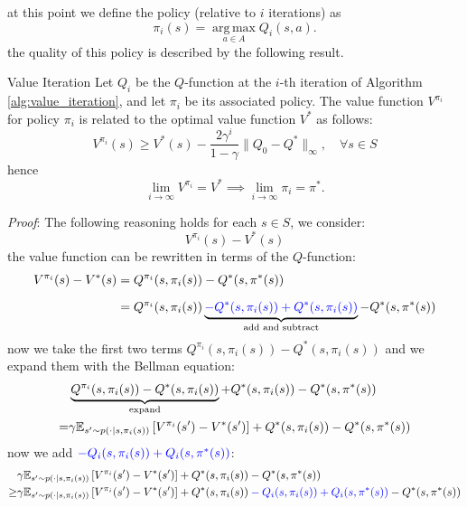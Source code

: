 \documentclass[10pt, a4paper]{report}
\begin{document}
at this point we define the policy (relative to $i$ iterations) as\begin{equation}
    \pi_i(s)=\operatorname*{arg\,max}_{a\in A}Q_i(s,a).
\end{equation}
the quality of this policy is described by the following result.
\begin{boxproposition}{Value Iteration}{}
Let $Q_i$ be the $Q$-function at the $i$-th iteration of Algorithm \ref{alg:value_iteration}, and let $\pi_i$ be its associated policy. The value function $V^{\pi_i}$ for policy $\pi_i$ is related to the optimal value function $V^*$ as follows:
\begin{equation}
    V^{\pi_i}(s)\ge V^*(s)-\frac{2\gamma^i}{1-\gamma}\|Q_0-Q^*\|_\infty,\quad \forall s\in S
\end{equation}
hence 
\begin{equation}
    \lim_{i\rightarrow\infty}V^{\pi_i}=V^*\implies  \lim_{i\rightarrow\infty}\pi_i=\pi^*.
\end{equation}
\end{boxproposition}
\noindent\textit{Proof}: The following reasoning holds for each $s\in S$, we consider:\begin{equation}
    V^{\pi_i}(s) - V^*(s)
\end{equation}
the value function can be rewritten in terms of the $Q$-function:
\begin{align}
    V^{\pi_i}(s) - V^*(s)&=Q^{\pi_i}(s,\pi_i(s))-Q^*(s,\pi^*(s))\\[1.5ex]
    &=Q^{\pi_i}(s,\pi_i(s))
    \underbrace{\color{blue}-Q^*(s,\pi_i(s))+Q^*(s,\pi_i(s))\color{black}}_{\text{add and subtract}}
    -Q^*(s,\pi^*(s))
\end{align}
now we take the first two terms $Q^{\pi_i}(s,\pi_i(s))-Q^*(s,\pi_i(s))$ and we expand them with the Bellman equation:\begin{align}
    &\underbrace{Q^{\pi_i}(s,\pi_i(s))
    -Q^*(s,\pi_i(s))}_{\text{expand}}+Q^*(s,\pi_i(s))
    -Q^*(s,\pi^*(s))\\
    =&\gamma{\mathbb E}_{s'\sim p(\cdot\mid s,\pi_i(s))}\left[
        V^{\pi_i}(s')-V^*(s')
    \right]+Q^*(s,\pi_i(s))
    -Q^*(s,\pi^*(s))\\ 
\end{align}
now we add $\color{blue}-Q_i(s,\pi_i(s))+Q_i(s,\pi^*(s))\color{black}$:\begin{align}
    &\gamma{\mathbb E}_{s'\sim p(\cdot\mid s,\pi_i(s))}\left[
        V^{\pi_i}(s')-V^*(s')
    \right]+Q^*(s,\pi_i(s))
    -Q^*(s,\pi^*(s))\\ 
    \ge&\gamma{\mathbb E}_{s'\sim p(\cdot\mid s,\pi_i(s))}\left[
        V^{\pi_i}(s')-V^*(s')
    \right]+Q^*(s,\pi_i(s))\color{blue}-Q_i(s,\pi_i(s))+Q_i(s,\pi^*(s))\color{black}
    -Q^*(s,\pi^*(s))
    \end{align}
\end{document}
